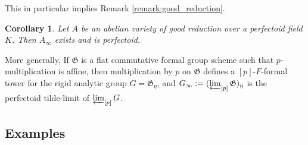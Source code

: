 \documentclass[10pt,oneside]{amsart}
\newtheorem{corollary}[theorem]{Corollary}
\theoremstyle{definition}
\newtheorem{remark}[theorem]{Remark}
\begin{document}
This in particular implies Remark \ref{remark:good_reduction}. 
	\begin{corollary}\label{tilde limit exists and is perfectoid in the good reduction case}
		Let $A$ be an abelian variety of good reduction over a perfectoid field $K$. Then $A_\infty$ exists and is perfectoid.
	\end{corollary}
	 	
More generally, If $\mathfrak G$ is a flat commutative formal group scheme such that $p$-multiplication is affine, then multiplication by $p$ on $\mathfrak G$ defines a $[p]$-$F$-formal tower for the rigid analytic group $G=\mathfrak G_\eta$, and  $G_\infty := (\varprojlim_{[p]}\mathfrak G)_\eta$ is the perfectoid tilde-limit of $\varprojlim_{[p]} G$. 

		
\subsection{Examples}				
		
\end{document}
